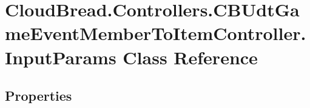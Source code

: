 \hypertarget{class_cloud_bread_1_1_controllers_1_1_c_b_udt_game_event_member_to_item_controller_1_1_input_params}{}\section{Cloud\+Bread.\+Controllers.\+C\+B\+Udt\+Game\+Event\+Member\+To\+Item\+Controller.\+Input\+Params Class Reference}
\label{class_cloud_bread_1_1_controllers_1_1_c_b_udt_game_event_member_to_item_controller_1_1_input_params}
\subsection*{Properties}
